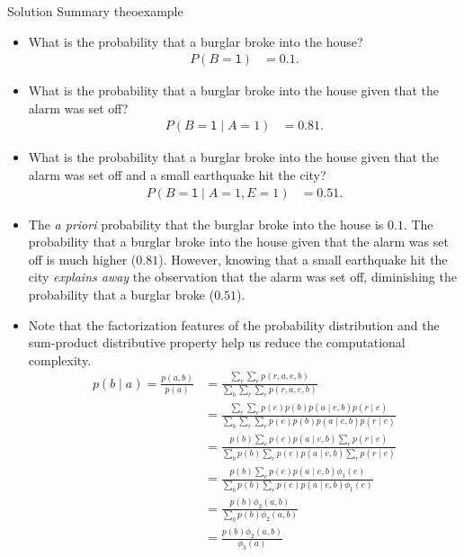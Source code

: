 \documentclass{tufte-handout}
\begin{document}
\begin{mybox}{Solution Summary }{theoexample}
\begin{itemize}
 \item What is the probability that a burglar broke into the house?
 \begin{align*}
P(B=\mathsf 1) &= 0.1.
\end{align*}
 \item What is the probability that a burglar broke into the house
 given that the alarm was set off?
 \begin{align*}
P(B=\mathsf 1\mid A=1) &= 0.81.
\end{align*}
 \item What is the probability that a burglar broke into the house given that the alarm was set off and a small earthquake hit the city?
 \begin{align*}
P(B=\mathsf 1\mid A=1,E=1) &= 0.51.
\end{align*}
\item The \textit{a priori} probability that the burglar broke into the house is $0.1$. The probability that a burglar broke into the house
 given that the alarm was set off is much higher  ($0.81$). However, knowing that a small earthquake hit the city \textit{explains away} the observation that the alarm was set off,
 diminishing the probability that a burglar broke ($0.51$). 
 \end{itemize} 
\end{mybox}
\begin{itemize}
 \item Note that the factorization features of the probability distribution and the sum-product distributive property help us reduce the computational complexity. 
 \begin{align*}
 p(b\mid a) = \frac{p(a,b)}{p(a)} &= \frac{\sum_r\sum_ep(r,a,e,b)}{\sum_b\sum_r\sum_ep(r,a,e,b)}\\
 					       &= \frac{\sum_r\sum_e p(e)p(b)p(a\mid e,b)p(r\mid e)}{\sum_b\sum_r\sum_e p(e)p(b)p(a\mid e,b)p(r\mid e)}\\
                                                 &= \frac{p(b)\sum_e p(e)p(a\mid e,b)\sum_rp(r\mid e)}{\sum_bp(b)\sum_e p(e)p(a\mid e,b)\sum_rp(r\mid e)}\\
                                                 &= \frac{p(b)\sum_e p(e)p(a\mid e,b)\phi_1(e)}{\sum_b p(b)\sum_e p(e)p(a\mid e,b)\phi_1(e)}\\
                                                  &= \frac{p(b)\phi_2(a,b)}{\sum_b p(b)\phi_2(a,b)}\\
                                                 &= \frac{p(b)\phi_2(a,b)}{\phi_3(a)}\\
 \end{align*}
\end{itemize}
\end{document}
